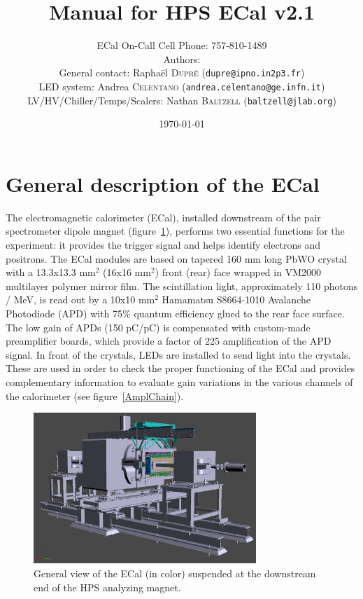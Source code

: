 \documentclass[12pt]{article}
\title{Manual for HPS ECal v2.1}
\author{ECal On-Call Cell Phone: 757-810-1489 \\ 
Authors: \\
General contact: Rapha\"el \textsc{Dupr\'e} (\texttt{dupre@ipno.in2p3.fr})\\ 
LED system: Andrea \textsc{Celentano} (\texttt{andrea.celentano@ge.infn.it})\\
LV/HV/Chiller/Temps/Scalers: Nathan \textsc{Baltzell} (\texttt{baltzell@jlab.org})\\
}
\date{\today} %
\begin{document}
\maketitle{}

\tableofcontents

\newpage
   \section{General description of the ECal}


The electromagnetic calorimeter (ECal), installed downstream of the pair spectrometer dipole magnet (figure~\ref{GView}), performs two essential functions for the experiment: it provides the trigger signal and helps identify electrons and positrons. The ECal modules are based on tapered 160 mm long PbWO crystal with a 13.3x13.3 mm$^2$ (16x16 mm$^2$) front (rear) face wrapped in VM2000 multilayer polymer mirror film. The scintillation light, approximately 110 photons / MeV, is read out by a 10x10 mm$^2$ Hamamatsu S8664-1010 Avalanche Photodiode (APD) with 75\% quantum efficiency glued to the rear face surface. The low gain of APDs (150 pC/pC) is compensated with custom-made preamplifier boards, which provide a factor of 225 amplification of the APD signal. In front of the crystals, LEDs are installed to send light into the crystals. These are used in order to check the proper functioning of the ECal and provides complementary information to evaluate gain variations in the various channels of the calorimeter (see figure~\ref{AmplChain}).

\begin{figure}[htpb]\center
\includegraphics[width=0.75\textwidth]{pics/GView.png}
\caption{\label{GView} General view of the ECal (in color) suspended at the downstream end of the HPS analyzing magnet.}
\end{figure}
      
\end{document}
